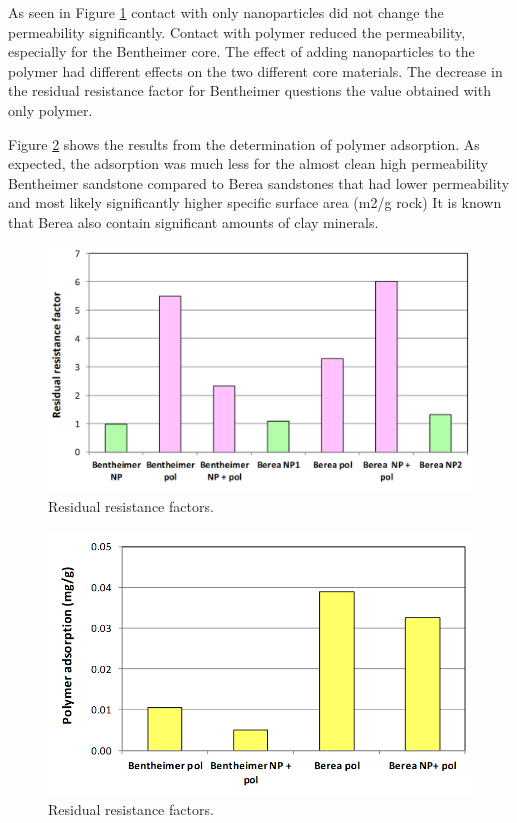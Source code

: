 As seen in Figure \ref{cht:rrf} contact with only nanoparticles did not change the permeability significantly. Contact with polymer reduced the permeability, especially for the Bentheimer core. The effect of adding nanoparticles to the polymer had different effects on the two different core materials. The decrease in the residual resistance factor for Bentheimer questions the value obtained with only polymer.

Figure \ref{cht:polAds} shows the results from the determination of polymer adsorption. As expected, the adsorption was much less for the almost clean high permeability Bentheimer sandstone compared to Berea sandstones that had lower permeability and most likely significantly higher specific surface area (m2/g rock) It is known that Berea also contain significant amounts of clay minerals.

\begin{figure}[p]
    \centering
    \includegraphics[width=\textwidth]{img/cht/rrf.png}
    \caption{Residual resistance factors.}
    \label{cht:rrf}
\end{figure}

\begin{figure}[p]
    \centering
    \includegraphics[width=\textwidth]{img/cht/polAds.png}
    \caption{Residual resistance factors.}
    \label{cht:polAds}
\end{figure}

